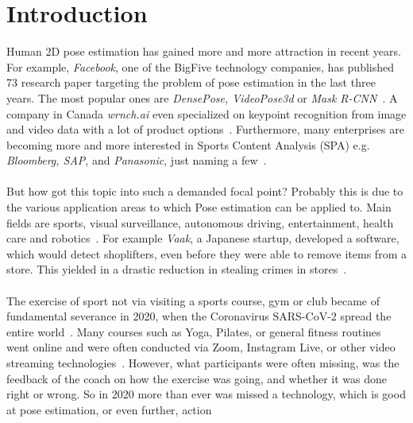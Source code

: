 


\chapter{Introduction} %

\label{introduction} %
Human 2D pose estimation has gained more and more attraction in recent years.
For example, \textit{Facebook}, one of the BigFive technology companies, has published 73 research paper targeting the
problem of pose estimation in the last three years.
The most popular ones are \textit{DensePose, VideoPose3d} or \textit{Mask R-CNN}~\cite{fbPub, DensePose, videopose3d, maskrcnn}.
A company in Canada \textit{wrnch.ai} even specialized on keypoint recognition from image and video data with a
lot of product options~\cite{wrnch}.
Furthermore, many enterprises are becoming more and more interested in Sports Content Analysis (SPA)
e.g. \textit{Bloomberg, SAP}, and \textit{Panasonic}, just naming a few~\cite{sappanasonic, spaBloomberg}.
\\\mbox{}\\
But how got this topic into such a demanded focal point?
Probably this is due to the various application areas to which Pose estimation can be applied to.
Main fields are sports, visual surveillance, autonomous driving, entertainment, health care and
robotics~\cite{olympicsport, surveillance, kinectWalkDepression}.
For example \textit{Vaak}, a Japanese startup, developed a software, which would detect shoplifters,
even before they were able to remove items from a store.
This yielded in a drastic reduction in stealing crimes in stores~\cite{vaak}.
\\\mbox{}\\
The exercise of sport not via visiting a sports course, gym or club became of fundamental severance in 2020,
when the Coronavirus SARS-CoV-2 spread the entire world~\cite{coronarki}.
Many courses such as Yoga, Pilates, or general fitness routines went online
and were often conducted via Zoom, Instagram Live, or other video streaming technologies~\cite{coronalife}.
However, what participants were often missing, was the feedback of the coach on how the exercise was going, and
whether it was done right or wrong.
So in 2020 more than ever was missed a technology, which is good at pose estimation, or even further, action
